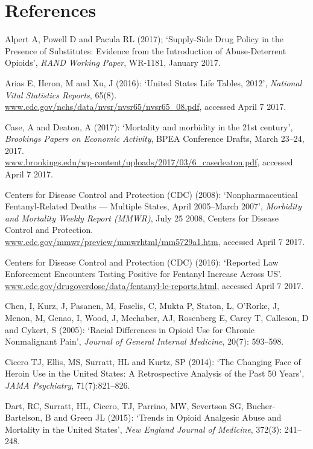 \documentclass[12pt, a4paper]{article}
\begin{document}
\section*{References}
\begin{description}
\item Alpert A, Powell D and Pacula RL (2017); `Supply-Side Drug Policy in the Presence of Substitutes: Evidence from the Introduction of Abuse-Deterrent Opioids', \textit{RAND Working Paper}, WR-1181, January 2017. 
\item Arias E, Heron, M and Xu, J (2016): `United States Life Tables, 2012', \textit{National Vital Statistics Reports}, 65(8). \url{www.cdc.gov/nchs/data/nvsr/nvsr65/nvsr65_08.pdf}, accessed April 7 2017.
\item Case, A and Deaton, A (2017): `Mortality and morbidity in the 21st century', \textit{Brookings Papers on Economic Activity}, BPEA Conference Drafts, March 23--24, 2017. \\\url{www.brookings.edu/wp-content/uploads/2017/03/6_casedeaton.pdf}, accessed April 7 2017.
\item Centers for Disease Control and Protection (CDC) (2008): `Nonpharmaceutical Fentanyl-Related Deaths --- Multiple States, April 2005--March 2007', \textit{Morbidity and Mortality Weekly Report (MMWR)}, July 25 2008, Centers for Disease Control and Protection. \url{www.cdc.gov/mmwr/preview/mmwrhtml/mm5729a1.htm}, accessed April 7 2017.
\item Centers for Disease Control and Protection (CDC) (2016): `Reported Law Enforcement Encounters Testing Positive for Fentanyl Increase Across US'. \url{www.cdc.gov/drugoverdose/data/fentanyl-le-reports.html}, accessed April 7 2017.
\item Chen, I, Kurz, J, Pasanen, M, Faselis, C, Mukta P, Staton, L, O'Rorke, J, Menon, M, Genao, I, Wood, J, Mechaber, AJ, Rosenberg E, Carey T, Calleson, D and Cykert, S (2005): `Racial Differences in Opioid Use for Chronic Nonmalignant Pain', \textit{Journal of General Internal Medicine}, 20(7): 593--598.
\item Cicero TJ, Ellis, MS, Surratt, HL and Kurtz, SP (2014): `The Changing Face of Heroin Use in the United States: A Retrospective Analysis of the Past 50 Years', \textit{JAMA Psychiatry}, 71(7):821--826.
\item Dart, RC, Surratt, HL, Cicero, TJ, Parrino, MW, Severtson SG, Bucher-Bartelson, B and Green JL (2015): `Trends in Opioid Analgesic Abuse and Mortality in the United States', \textit{New England Journal of Medicine}, 372(3): 241--248.

\end{description}
\end{document}
